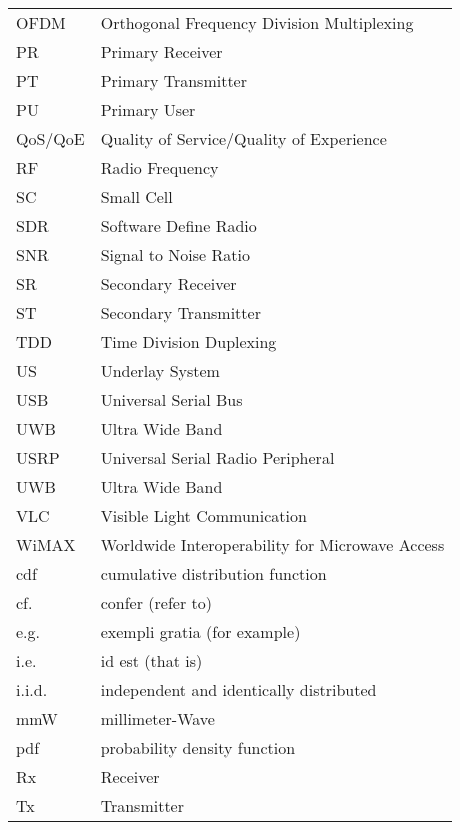 \begin{longtable}{p{}p{}}
	OFDM	&	Orthogonal Frequency Division Multiplexing\\
	PR	& 	Primary Receiver \\
	PT	& 	Primary Transmitter \\
	PU	& 	Primary User \\
	QoS/QoE & 	Quality of Service/Quality of Experience \\
	RF	&	Radio Frequency \\
	SC 	&	Small Cell \\
	SDR 	&	Software Define Radio \\
	SNR	&	Signal to Noise Ratio \\
	SR	& 	Secondary Receiver \\
	ST	& 	Secondary Transmitter \\
	TDD	& 	Time Division Duplexing \\
	US	&	Underlay System \\
	USB	&	Universal Serial Bus \\
	UWB 	&	Ultra Wide Band \\
	USRP	&	Universal Serial Radio Peripheral\\
	UWB 	&	Ultra Wide Band \\
	VLC 	&	Visible Light Communication\\
	WiMAX   &       Worldwide Interoperability for Microwave Access \\

	cdf	&       cumulative distribution function \\
	cf.	&	confer (refer to) \\ 
 	e.g.	& 	exempli gratia (for example) \\
 	i.e.	& 	id est (that is) \\ 
 	i.i.d.	& 	independent and identically distributed \\ 
	mmW 	&       millimeter-Wave\\
	pdf	&       probability density function \\
 	Rx	& 	Receiver \\
 	Tx	& 	Transmitter

\end{longtable}
  


